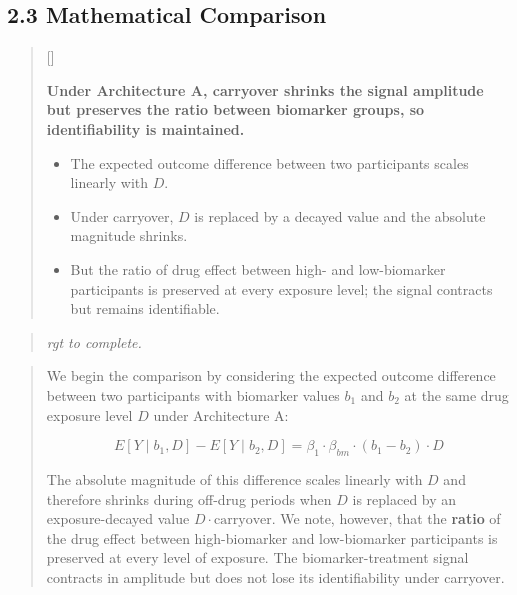 \documentclass[
  11pt,
]{article}
\newcounter{pgraph}
\newenvironment{bullets}{%
  \stepcounter{pgraph}%
  \begin{quote}\small\sffamily\color[gray]{0.30}%
  {\normalfont\scriptsize\color[gray]{0.58}[\thepgraph]\enspace}}{%
  \end{quote}}
\newenvironment{rgt}{%
  \begin{quote}\small\itshape\color[RGB]{20,60,160}}{%
  \end{quote}}
\newenvironment{orig}{%
  \begin{quote}\normalsize\color[gray]{0.55}}{%
  \end{quote}}
\begin{document}
\subsection{2.3 Mathematical Comparison}

\begin{bullets}

\textbf{Under Architecture A, carryover shrinks the signal
amplitude but preserves the ratio between biomarker groups,
so identifiability is maintained.}

\begin{itemize}\setlength{\itemsep}{2pt}\setlength{\parskip}{0pt}
\item The expected outcome difference between two participants
  scales linearly with $D$.
\item Under carryover, $D$ is replaced by a decayed value and
  the absolute magnitude shrinks.
\item But the ratio of drug effect between high- and
  low-biomarker participants is preserved at every exposure
  level; the signal contracts but remains identifiable.
\end{itemize}

\end{bullets}

\begin{rgt}
rgt to complete.

\end{rgt}

\begin{orig}
We begin the comparison by considering the expected outcome difference
between two participants with biomarker values \(b_1\) and \(b_2\) at
the same drug exposure level \(D\) under Architecture A:

\[E[Y \mid b_1, D] - E[Y \mid b_2, D] = \beta_1 \cdot \beta_{bm}
\cdot (b_1 - b_2) \cdot D\]

The absolute magnitude of this difference scales linearly with \(D\) and
therefore shrinks during off-drug periods when \(D\) is replaced by an
exposure-decayed value \(D \cdot \text{carryover}\). We note, however,
that the \textbf{ratio} of the drug effect between high-biomarker and
low-biomarker participants is preserved at every level of exposure. The
biomarker-treatment signal contracts in amplitude but does not lose its
identifiability under carryover.

\end{orig}
\end{document}
